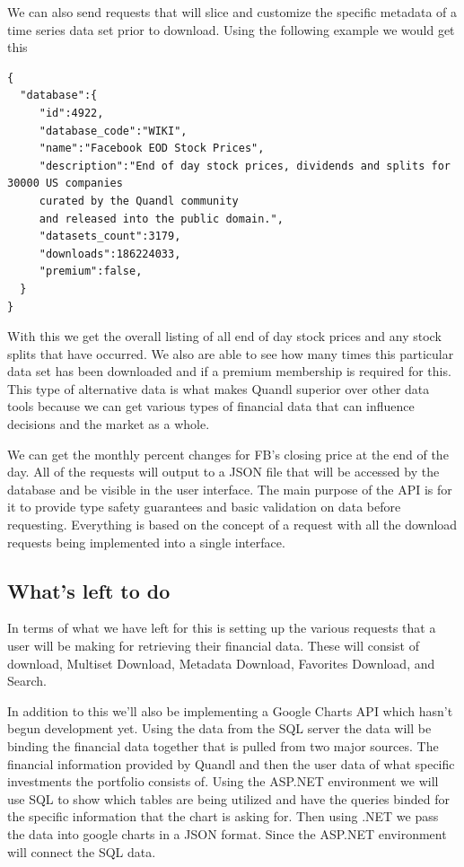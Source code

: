 \documentclass[letterpaper,10pt,titlepage,journal,compsoc,draftclsnofoot,onecolumn]{IEEEtran}
\begin{document}
 We can also send requests that will slice and customize the specific metadata of a time series data set prior to download. Using the following example  we would get this

\begin{lstlisting}
{  
  "database":{  
     "id":4922,
     "database_code":"WIKI",
     "name":"Facebook EOD Stock Prices",
     "description":"End of day stock prices, dividends and splits for 30000 US companies 
     curated by the Quandl community 
     and released into the public domain.",
     "datasets_count":3179,
     "downloads":186224033,
     "premium":false,
  }
}
\end{lstlisting}
With this we get the overall listing of all end of day stock prices and any stock splits that have occurred. We also are able to see how many times this particular data set has been downloaded and if a premium membership is required for this. This type of alternative data is what makes Quandl superior over other data tools because we can get various types of financial data that can influence decisions and the market as a whole. 

 We can get the monthly percent changes for FB’s closing price at the end of the day. All of the requests will output to a JSON file that will be accessed by the database and be visible in the user interface. The main purpose of the API is for it to provide type safety guarantees and basic validation on data before requesting. Everything is based on the concept of a request with all the download requests being implemented into a single interface.
 
\subsection{What's left to do}

In terms of what we have left for this is setting up the various requests that a user will be making for retrieving their financial data. These will consist of download, Multiset Download, Metadata Download, Favorites Download, and Search.
 
 In addition to this we’ll also be implementing a Google Charts API which hasn’t begun development yet. Using the data from the SQL server the data will be binding the financial data together that is pulled from two major sources. The financial information provided by Quandl and then the user data of what specific investments the portfolio consists of. Using the ASP.NET environment we will use SQL to show which tables are being utilized and have the queries binded for the specific information that the chart is asking for. Then using .NET we pass the data into google charts in a JSON format. Since the ASP.NET environment will connect the SQL data.
 
\end{document}
